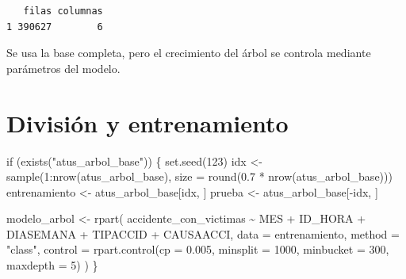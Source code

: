 \documentclass[
  spanish,
  11pt,
  letterpaper,
]{book}
\newenvironment{Shaded}{}{}
\newcommand{\AttributeTok}[1]{\textcolor[rgb]{0.84,0.23,0.29}{#1}}
\newcommand{\ControlFlowTok}[1]{\textcolor[rgb]{0.84,0.23,0.29}{#1}}
\newcommand{\DecValTok}[1]{\textcolor[rgb]{0.00,0.36,0.77}{#1}}
\newcommand{\FloatTok}[1]{\textcolor[rgb]{0.00,0.36,0.77}{#1}}
\newcommand{\FunctionTok}[1]{\textcolor[rgb]{0.44,0.26,0.76}{#1}}
\newcommand{\NormalTok}[1]{\textcolor[rgb]{0.14,0.16,0.18}{#1}}
\newcommand{\OtherTok}[1]{\textcolor[rgb]{0.44,0.26,0.76}{#1}}
\newcommand{\SpecialCharTok}[1]{\textcolor[rgb]{0.00,0.36,0.77}{#1}}
\newcommand{\StringTok}[1]{\textcolor[rgb]{0.01,0.18,0.38}{#1}}
\begin{document}
\begin{verbatim}
   filas columnas
1 390627        6
\end{verbatim}

\begin{tcolorbox}[enhanced jigsaw, arc=.35mm, bottomrule=.15mm, bottomtitle=1mm, breakable, colback=white, colbacktitle=quarto-callout-note-color!10!white, colframe=quarto-callout-note-color-frame, coltitle=black, left=2mm, leftrule=.75mm, opacityback=0, opacitybacktitle=0.6, rightrule=.15mm, title=\textcolor{quarto-callout-note-color}{\faInfo}\hspace{0.5em}{Explicación del código}, titlerule=0mm, toprule=.15mm, toptitle=1mm]

Se usa la base completa, pero el crecimiento del árbol se controla
mediante parámetros del modelo.

\end{tcolorbox}

\section{División y entrenamiento}\label{divisiuxf3n-y-entrenamiento}

\begin{Shaded}
\begin{Highlighting}[]
\ControlFlowTok{if}\NormalTok{ (}\FunctionTok{exists}\NormalTok{(}\StringTok{"atus\_arbol\_base"}\NormalTok{)) \{}
  \FunctionTok{set.seed}\NormalTok{(}\DecValTok{123}\NormalTok{)}
\NormalTok{  idx }\OtherTok{\textless{}{-}} \FunctionTok{sample}\NormalTok{(}\DecValTok{1}\SpecialCharTok{:}\FunctionTok{nrow}\NormalTok{(atus\_arbol\_base), }\AttributeTok{size =} \FunctionTok{round}\NormalTok{(}\FloatTok{0.7} \SpecialCharTok{*} \FunctionTok{nrow}\NormalTok{(atus\_arbol\_base)))}
\NormalTok{  entrenamiento }\OtherTok{\textless{}{-}}\NormalTok{ atus\_arbol\_base[idx, ]}
\NormalTok{  prueba }\OtherTok{\textless{}{-}}\NormalTok{ atus\_arbol\_base[}\SpecialCharTok{{-}}\NormalTok{idx, ]}

\NormalTok{  modelo\_arbol }\OtherTok{\textless{}{-}} \FunctionTok{rpart}\NormalTok{(}
\NormalTok{    accidente\_con\_victimas }\SpecialCharTok{\textasciitilde{}}\NormalTok{ MES }\SpecialCharTok{+}\NormalTok{ ID\_HORA }\SpecialCharTok{+}\NormalTok{ DIASEMANA }\SpecialCharTok{+}\NormalTok{ TIPACCID }\SpecialCharTok{+}\NormalTok{ CAUSAACCI,}
    \AttributeTok{data =}\NormalTok{ entrenamiento,}
    \AttributeTok{method =} \StringTok{"class"}\NormalTok{,}
    \AttributeTok{control =} \FunctionTok{rpart.control}\NormalTok{(}\AttributeTok{cp =} \FloatTok{0.005}\NormalTok{, }\AttributeTok{minsplit =} \DecValTok{1000}\NormalTok{, }\AttributeTok{minbucket =} \DecValTok{300}\NormalTok{, }\AttributeTok{maxdepth =} \DecValTok{5}\NormalTok{)}
\NormalTok{  )}
\NormalTok{\}}
\end{Highlighting}
\end{Shaded}
\end{document}
